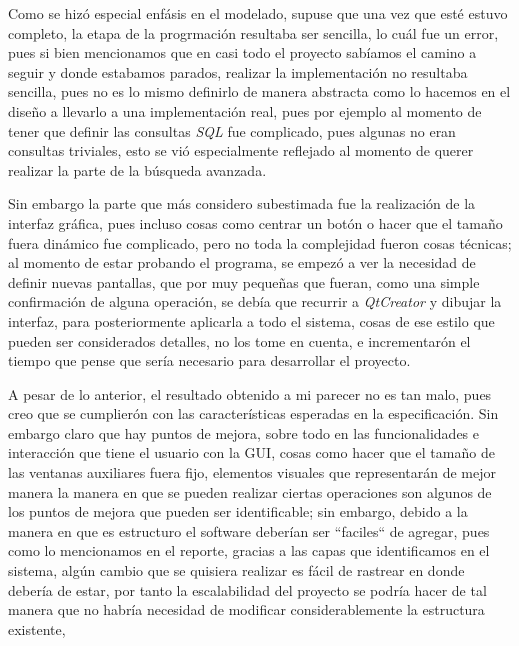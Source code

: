 \documentclass[10pt,letterpaper]{report}
\begin{document}
    \vspace{0.2cm}

    \noindent Como se hizó especial enfásis en el modelado, supuse que una vez que esté estuvo completo, la etapa de la progrmación resultaba ser sencilla, lo cuál fue un error, pues si bien mencionamos que en casi todo el proyecto sabíamos el camino a seguir y donde estabamos parados, realizar la implementación no resultaba sencilla, pues no es lo mismo definirlo de manera abstracta como lo hacemos en el diseño a llevarlo a una implementación real, pues por ejemplo al momento de tener que definir las consultas \textit{SQL} fue complicado, pues algunas no eran consultas triviales, esto se vió especialmente reflejado al momento de querer realizar la parte de la búsqueda avanzada. 
    
    \noindent Sin embargo la parte que más considero subestimada fue la realización de la interfaz gráfica, pues incluso cosas como centrar un botón o hacer que el tamaño fuera dinámico fue complicado, pero no toda la complejidad fueron cosas técnicas; al momento de estar probando el programa, se empezó a ver la necesidad de definir nuevas pantallas, que por muy pequeñas que fueran, como una simple confirmación de alguna operación, se debía que recurrir a \textit{QtCreator} y dibujar la interfaz, para posteriormente aplicarla a todo el sistema, cosas de ese estilo que pueden ser considerados detalles, no los tome en cuenta, e incrementarón el tiempo que pense que sería necesario para desarrollar el proyecto.

    \vspace{0.2cm}

    \noindent A pesar de lo anterior, el resultado obtenido a mi parecer no es tan malo, pues creo que se cumplierón con las características esperadas en la especificación. Sin embargo claro que hay puntos de mejora, sobre todo en las funcionalidades e interacción que tiene el usuario con la GUI, cosas como hacer que el tamaño de las ventanas auxiliares fuera fijo, elementos visuales que representarán de mejor manera la manera en que se pueden realizar ciertas operaciones son algunos de los puntos de mejora que pueden ser identificable; sin embargo, debido a la manera en que es estructuro el software deberían ser ``faciles`` de agregar, pues como lo mencionamos en el reporte, gracias a las capas que identificamos en el sistema, algún cambio que se quisiera realizar es fácil de rastrear en donde debería de estar, por tanto la escalabilidad del proyecto se podría hacer de tal manera que no habría necesidad de modificar considerablemente la estructura existente,
\end{document}
